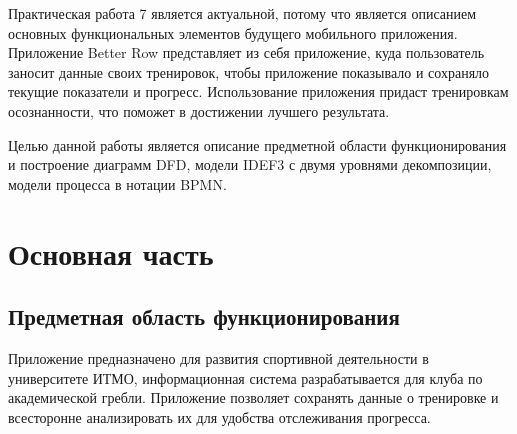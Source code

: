 \documentclass[14pt]{extreport}
\begin{document}
\pagestyle{empty}

\pagestyle{plain}

\tableofcontents

\intro

Практическая работа 7 является актуальной, потому что является описанием основных функциональных элементов будущего мобильного приложения. Приложение Better Row представляет из себя приложение, куда пользователь заносит данные своих тренировок, чтобы приложение показывало и сохраняло текущие показатели и прогресс. Использование приложения придаст тренировкам осознанности, что поможет в достижении лучшего результата.

Целью данной работы является описание предметной области функционирования и построение диаграмм DFD, модели IDEF3 с двумя уровнями декомпозиции, модели процесса в нотации BPMN.

\chapter{Основная часть}

\section{Предметная область функционирования}

Приложение предназначено для развития спортивной деятельности в университете ИТМО, информационная система разрабатывается для клуба по академической гребли. Приложение позволяет сохранять данные о тренировке и всесторонне анализировать их для удобства отслеживания прогресса.
\end{document}
